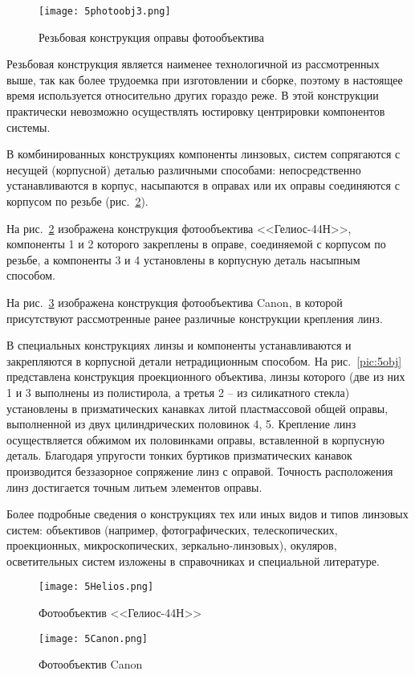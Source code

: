\begin{figure}[h!]
	\caption{ Резьбовая конструкция оправы фотообъектива }
	\texttt{[image: 5photoobj3.png]}
	\label{pic:5photoobj3}
\end{figure}

Резьбовая конструкция является наименее технологичной из рассмотренных выше, так как более трудоемка при изготовлении и сборке, поэтому в настоящее время используется относительно других гораздо реже. В этой конструкции практически невозможно осуществлять юстировку центрировки компонентов системы.

В комбинированных конструкциях компоненты линзовых, систем сопрягаются с несущей (корпусной) деталью различными способами: непосредственно устанавливаются в корпус, насыпаются в оправах или их оправы соединяются с корпусом по резьбе (рис.~\ref{pic:5helios}).

На рис.~\ref{pic:5helios} изображена конструкция фотообъектива <<Гелиос-44Н>>, компоненты 1 и 2 которого закреплены в оправе, соединяемой с корпусом по резьбе, а компоненты 3 и 4 установлены в корпусную деталь насыпным способом. 

На рис.~\ref{pic:5Canon} изображена конструкция фотообъектива Canon, в которой присутствуют рассмотренные ранее различные конструкции крепления линз.

В специальных конструкциях линзы и компоненты устанавливаются и закрепляются в корпусной детали нетрадиционным способом. На рис.~\ref{pic:5obj} представлена конструкция проекционного объектива, линзы которого (две из них 1 и 3 выполнены из полистирола, а третья 2 -- из силикатного стекла) установлены в призматических канавках литой пластмассовой общей оправы, выполненной из двух цилиндрических половинок 4, 5. Крепление линз осуществляется обжимом их половинками оправы, вставленной в корпусную деталь. Благодаря упругости тонких буртиков призматических канавок производится беззазорное сопряжение линз с оправой. Точность расположения линз достигается точным литьем элементов оправы.

Более подробные сведения о конструкциях тех или иных видов и типов линзовых систем: объективов (например, фотографических, телескопических, проекционных, микроскопических, зеркально-линзовых), окуляров, осветительных систем изложены в справочниках и специальной литературе.
\begin{landscape}
	
	\begin{figure}[h!]
		\caption{ Фотообъектив <<Гелиос-44Н>> }
		\texttt{[image: 5Helios.png]}
		\label{pic:5helios}
	\end{figure}
	
	\begin{figure}[h!]
		\caption{ Фотообъектив Canon }
		\texttt{[image: 5Canon.png]}
		\label{pic:5Canon}
	\end{figure}
\end{landscape}

